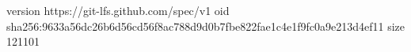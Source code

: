 version https://git-lfs.github.com/spec/v1
oid sha256:9633a56dc26b6d56cd56f8ac788d9d0b7fbe822fae1c4e1f9fc0a9e213d4ef11
size 121101
